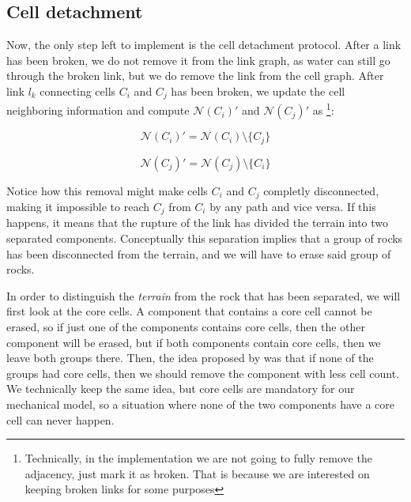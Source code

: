 \subsection{Cell detachment}\label{sec:detachment}
Now, the only step left to implement is the cell detachment protocol.
After a link has been broken, we do not remove it from the link 
graph, as water can still go through the broken link, but we do 
remove the link from the cell graph. After link $l_k$ connecting 
cells $C_i$ and $C_j$ has been broken, we update the cell neighboring 
information and compute $\mathcal{N}(C_i)'$ and $\mathcal{N}(C_j)'$ as 
\footnote{Technically, in the implementation we are not going to fully 
remove the adjacency, just mark it as broken. That is because we are 
interested on keeping broken links for some purposes}:

\begin{equation}\label{eq:neigh_update}
    \mathcal{N}(C_i)' = \mathcal{N}(C_i) \setminus \{C_j\}
\end{equation}

\begin{equation}
    \mathcal{N}(C_j)' = \mathcal{N}(C_j) \setminus \{C_i\}
\end{equation}

Notice how this removal might make cells $C_i$ and $C_j$ completly 
disconnected, making it impossible to reach $C_j$ from $C_i$ by any path 
and vice versa. If this happens, it means that the rupture of the 
link has divided the terrain into two separated components. Conceptually 
this separation implies that a group of rocks has been disconnected from 
the terrain, and we will have to erase said group of rocks.

\vspace{10pt}

In order to distinguish the \textit{terrain} from the rock that has been 
separated, we will first look at the core cells. A component that contains 
a core cell cannot be erased, so if just one of the components contains 
core cells, then the other component will be erased, but if both components
contain core cells, then we leave both groups there. Then, the idea proposed 
by \cite{10.2312:ceig.20241139} was that if none of the groups had core
cells, then we should remove the component with less cell count. We
technically keep the same idea, but core cells are mandatory for our 
mechanical model, so a situation where none of the two components have 
a core cell can never happen.

\vspace{10pt}


